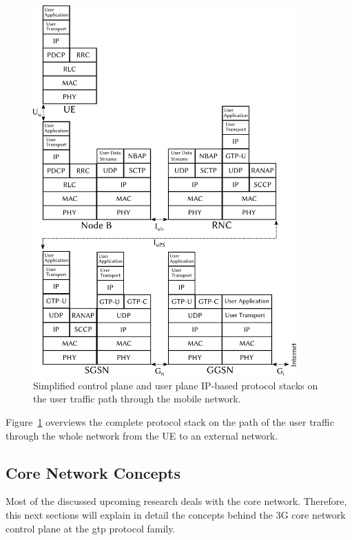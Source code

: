 \begin{figure}[htbp]
	\centering
	\includegraphics[width=0.9\textwidth]{images/umts-userpath-stack.pdf}
	\caption{Simplified control plane and user plane \acrshort{IP}-based protocol stacks on the user traffic path through the mobile network.}
\label{c4:fig:protocolstacks}
\end{figure}

Figure~\ref{c4:fig:protocolstacks} overviews the complete protocol stack on the path of the user traffic through the whole network from the \gls{UE} to an external network.


\subsection{Core Network Concepts}

Most of the discussed upcoming research deals with the core network. Therefore, this next sections will explain in detail the concepts behind the \gls{3G} core network control plane at the \gls{gtp} protocol family.

